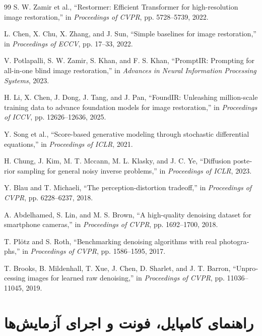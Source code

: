 \documentclass[12pt,openany,oneside]{book}
\begin{document}
\begin{latin}
\begin{thebibliography}{99}
S. W. Zamir et al.,
``Restormer: Efficient Transformer for high-resolution image restoration,''
in \textit{Proceedings of CVPR}, pp. 5728--5739, 2022.

L. Chen, X. Chu, X. Zhang, and J. Sun,
``Simple baselines for image restoration,''
in \textit{Proceedings of ECCV}, pp. 17--33, 2022.

V. Potlapalli, S. W. Zamir, S. Khan, and F. S. Khan,
``PromptIR: Prompting for all-in-one blind image restoration,''
in \textit{Advances in Neural Information Processing Systems}, 2023.

H. Li, X. Chen, J. Dong, J. Tang, and J. Pan,
``FoundIR: Unleashing million-scale training data to advance foundation models for image restoration,''
in \textit{Proceedings of ICCV}, pp. 12626--12636, 2025.

Y. Song et al.,
``Score-based generative modeling through stochastic differential equations,''
in \textit{Proceedings of ICLR}, 2021.

H. Chung, J. Kim, M. T. Mccann, M. L. Klasky, and J. C. Ye,
``Diffusion posterior sampling for general noisy inverse problems,''
in \textit{Proceedings of ICLR}, 2023.

Y. Blau and T. Michaeli,
``The perception-distortion tradeoff,''
in \textit{Proceedings of CVPR}, pp. 6228--6237, 2018.

A. Abdelhamed, S. Lin, and M. S. Brown,
``A high-quality denoising dataset for smartphone cameras,''
in \textit{Proceedings of CVPR}, pp. 1692--1700, 2018.

T. Plötz and S. Roth,
``Benchmarking denoising algorithms with real photographs,''
in \textit{Proceedings of CVPR}, pp. 1586--1595, 2017.

T. Brooks, B. Mildenhall, T. Xue, J. Chen, D. Sharlet, and J. T. Barron,
``Unprocessing images for learned raw denoising,''
in \textit{Proceedings of CVPR}, pp. 11036--11045, 2019.

\end{thebibliography}
\end{latin}

\chapter*{راهنمای کامپایل، فونت و اجرای آزمایش‌ها}
\end{document}
